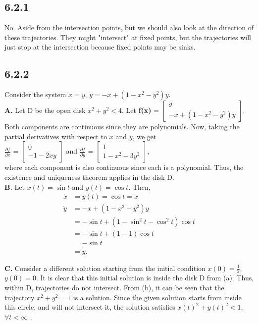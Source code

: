 \documentclass[]{article}
\begin{document}
	\subsection*{6.2.1}
	No. Aside from the intersection points, but we should also look at the direction of these trajectories. They might "intersect" at fixed points, but the trajectories will just stop at the intersection because fixed points may be sinks.
	\subsection*{6.2.2}
	Consider the system $\dot{x} = y$, $\dot{y} = -x + (1 - x^2 - y^2)y$. \\
	\textbf{A.} Let D be the open disk $x^2 + y^2 < 4$. Let \textbf{f(x)} = $ \begin{bmatrix}
	y \\
	-x + (1 - x^2 - y^2)y
	\end{bmatrix}.$ 
	\\Both components are continuous since they are polynomials. Now, taking the partial derivatives with respect to $x$ and $y$, we get \\
	\textbf{$\frac{\partial f}{\partial x}$} = $\begin{bmatrix}
	0 \\
	-1 -2xy
	\end{bmatrix}$ and \textbf{$\frac{\partial f}{\partial y}$} = $\begin{bmatrix}
	1 \\
	1 - x^2 - 3y^2
	\end{bmatrix}$, \\ 
	where each component is also continuous since each is a polynomial. Thus, the existence and uniqueness theorem applies in the disk D. \\
	
	\textbf{B.} Let $x(t) = \sin t$ and $y(t) = \cos t$. Then, \begin{align*}
	\dot{x} &= y(t) = \cos t = \dot{x}\\
	\dot{y} &= -x + (1 - x^2 - y^2)y \\
	&= - \sin t + (1 - \sin^2 t - \cos^2 t)\cos t \\
	&= - \sin t + (1 - 1)\cos t \\
	&= - \sin t \\
	&= \dot{y}.
	\end{align*}
	
	\textbf{C.} Consider a different solution starting from the initial condition 
	$x(0) = \frac{1}{2}$, $y(0) = 0$. It is clear that this initial solution is inside the disk D from (a). Thus, within D, trajectories do not intersect. From (b), it can be seen that the trajectory $x^2 + y^2 = 1$ is a solution. Since the given solution starts from inside this circle, and will not intersect it, the solution satisfies $x(t)^2 + y(t)^2 < 1$,  $\forall t < \infty$ .
	
\end{document}
